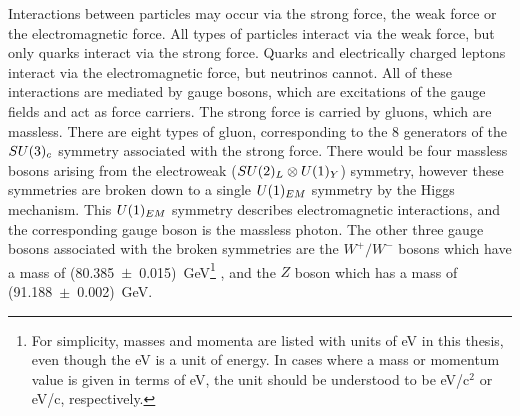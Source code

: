 Interactions between particles may occur via the strong force, the weak force or the electromagnetic force. All types of particles interact via the weak force, but only quarks interact via the strong force. Quarks and electrically charged leptons interact via the electromagnetic force, but neutrinos cannot.
All of these interactions are mediated by gauge bosons, which are excitations of the gauge fields and act as force carriers. The strong force is carried by gluons, which are massless. There are eight types of gluon, corresponding to the 8 generators of the $SU(3)_c$ symmetry associated with the strong force. There would be four massless bosons arising from the electroweak ($SU(2)_L \otimes U(1)_Y$) symmetry, however these symmetries are broken down to a single $U(1)_{EM}$ symmetry by the Higgs mechanism\cite{burgessSM}. This $U(1)_{EM}$ symmetry describes electromagnetic interactions, and the corresponding gauge boson is the massless photon. The other three gauge bosons associated with the broken symmetries are the $W^{+}/W^{-}$ bosons which have a mass of (80.385~$\pm$~0.015)~GeV\footnote{For simplicity, masses and momenta are listed with units of eV in this thesis, even though the eV is a unit of energy. In cases where a mass or momentum value is given in terms of eV, the unit should be understood to be eV/$\mathrm{c}^2$ or eV/c, respectively.} , and the $Z$ boson which has a mass of (91.188~$\pm$~0.002)~GeV\cite{reviewPP2012}.
%
%
%

